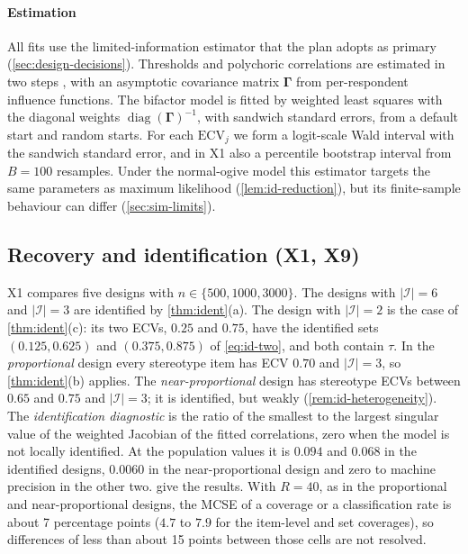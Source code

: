 \paragraph{Estimation}
All fits use the limited-information estimator that the plan adopts as primary (\cref{sec:design-decisions}). Thresholds and polychoric correlations are estimated in two steps \citep{olsson1979}, with an asymptotic covariance matrix $\bm\Gamma$ from per-respondent influence functions. The bifactor model is fitted by weighted least squares with the diagonal weights $\operatorname{diag}(\bm\Gamma)^{-1}$, with sandwich standard errors, from a default start and random starts. For each $\mathrm{ECV}_j$ we form a logit-scale Wald interval with the sandwich standard error, and in X1 also a percentile bootstrap interval from $B=100$ resamples. Under the normal-ogive model this estimator targets the same parameters as maximum likelihood (\cref{lem:id-reduction}), but its finite-sample behaviour can differ (\cref{sec:sim-limits}).

\subsection{Recovery and identification (X1, X9)}\label{sec:sim-recovery}

X1 compares five designs with $n\in\{500,1000,3000\}$. The designs with $|\mathcal I|=6$ and $|\mathcal I|=3$ are identified by \cref{thm:ident}(a). The design with $|\mathcal I|=2$ is the case of \cref{thm:ident}(c): its two ECVs, $0.25$ and $0.75$, have the identified sets $(0.125,0.625)$ and $(0.375,0.875)$ of \eqref{eq:id-two}, and both contain $\tau$. In the \emph{proportional} design every stereotype item has ECV $0.70$ and $|\mathcal I|=3$, so \cref{thm:ident}(b) applies. The \emph{near-proportional} design has stereotype ECVs between $0.65$ and $0.75$ and $|\mathcal I|=3$; it is identified, but weakly (\cref{rem:id-heterogeneity}). The \emph{identification diagnostic} is the ratio of the smallest to the largest singular value of the weighted Jacobian of the fitted correlations, zero when the model is not locally identified. At the population values it is $0.094$ and $0.068$ in the identified designs, $0.0060$ in the near-proportional design and zero to machine precision in the other two.  give the results. With $R=40$, as in the proportional and near-proportional designs, the MCSE of a coverage or a classification rate is about 7 percentage points ($4.7$ to $7.9$ for the item-level and set coverages), so differences of less than about 15 points between those cells are not resolved.

